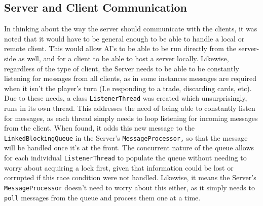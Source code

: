 \documentclass[a4paper,doc]{apa6}
\newcommand{\code}{\texttt}
\begin{document}
\subsection{Server and Client Communication}
In thinking about the way the server should communicate with the clients, it was noted that it would have to be general enough to be able to handle a local or remote client. This would allow AI’s to be able to be run directly from the server-side as well, and for a client to be able to host a server locally. Likewise, regardless of the type of client, the Server needs to be able to be constantly listening for messages from all clients, as in some instances messages are required when it isn’t the player’s turn (I.e responding to a trade, discarding cards, etc). Due to these needs, a class \code{ListenerThread} was created which unsurprisingly, runs in its own thread. This addresses the need of being able to constantly listen for messages, as each thread simply needs to loop listening for incoming messages from the client. When found, it adds this new message to the \code{LinkedBlockingQueue} in the Server’s \code{MessageProcessor,} so that the message will be handled once it’s at the front. The concurrent nature of the queue allows for each individual \code{ListenerThread} to populate the queue without needing to worry about acquiring a lock first, given that information could be lost or corrupted if this race condition were not handled. Likewise, it means the Server’s \code{MessageProcessor} doesn’t need to worry about this either, as it simply needs to \code{poll} messages from the queue and process them one at a time.
\end{document}
